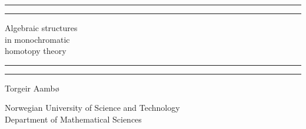 
\begin{titlingpage}



    \vspace*{5cm}

    \rule[-11pt]{\textwidth}{1pt}
    \rule{\textwidth}{0.5pt}

    \begin{center}
    \Huge Algebraic structures \\ in monochromatic \\ homotopy theory
    \end{center}

    \rule{\textwidth}{0.5pt}
    \rule[11pt]{\textwidth}{1pt}


    \begin{center}
    Torgeir Aambø
    \end{center}



    \vspace{\fill}


    \begin{center}
        Norwegian University of Science and Technology \\
        Department of Mathematical Sciences 
    \end{center}


\end{titlingpage}